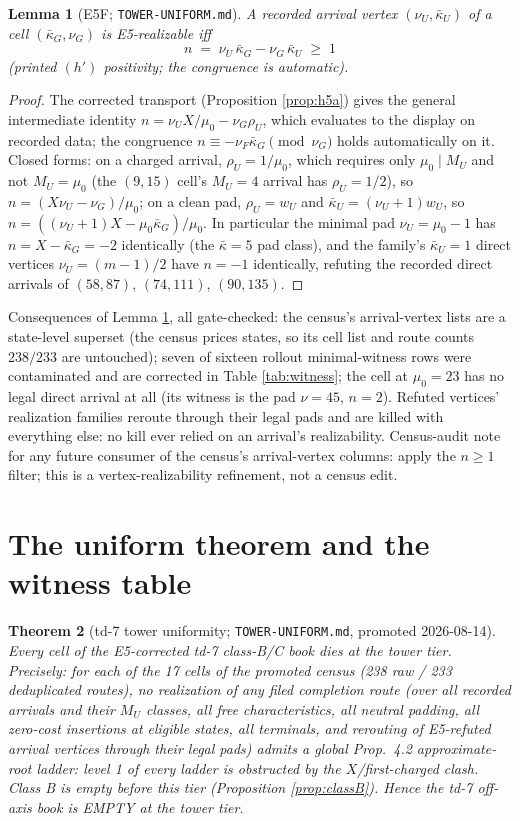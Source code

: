 \documentclass[11pt]{article}
\newtheorem{theorem}{Theorem}[section]
\newtheorem{lemma}[theorem]{Lemma}
\theoremstyle{definition}
\theoremstyle{remark}
\newcommand{\kb}{\bar\kappa}
\begin{document}
\begin{lemma}[E5F; \texttt{TOWER-UNIFORM.md}]\label{lem:E5F}
A recorded arrival vertex $(\nu_U,\kb_U)$ of a cell $(\kb_G,\nu_G)$ is E5-realizable iff
\[
n\;=\;\nu_U\,\kb_G-\nu_G\,\kb_U\;\geq\;1
\]
(printed $(h')$ positivity; the congruence is automatic).
\end{lemma}

\begin{proof}
The corrected transport (Proposition \ref{prop:h5a}) gives the general intermediate identity $n=\nu_U X/\mu_0-\nu_G\rho_U$, which evaluates to the display on recorded data; the congruence $n\equiv-\nu_F\kb_G\pmod{\nu_G}$ holds automatically on it. Closed forms: on a charged arrival, $\rho_U=1/\mu_0$, which requires only $\mu_0\mid M_U$ and not $M_U=\mu_0$ (the $(9,15)$ cell's $M_U=4$ arrival has $\rho_U=1/2$), so $n=(X\nu_U-\nu_G)/\mu_0$; on a clean pad, $\rho_U=w_U$ and $\kb_U=(\nu_U+1)w_U$, so $n=((\nu_U+1)X-\mu_0\kb_G)/\mu_0$. In particular the minimal pad $\nu_U=\mu_0-1$ has $n=X-\kb_G=-2$ identically (the $\kb=5$ pad class), and the family's $\kb_U=1$ direct vertices $\nu_U=(m-1)/2$ have $n=-1$ identically, refuting the recorded direct arrivals of $(58,87)$, $(74,111)$, $(90,135)$.
\end{proof}

Consequences of Lemma \ref{lem:E5F}, all gate-checked: the census's arrival-vertex lists are a state-level superset (the census prices states, so its cell list and route counts $238/233$ are untouched); seven of sixteen rollout minimal-witness rows were contaminated and are corrected in Table \ref{tab:witness}; the cell at $\mu_0=23$ has no legal direct arrival at all (its witness is the pad $\nu=45$, $n=2$). Refuted vertices' realization families reroute through their legal pads and are killed with everything else: no kill ever relied on an arrival's realizability. Census-audit note for any future consumer of the census's arrival-vertex columns: apply the $n\geq1$ filter; this is a vertex-realizability refinement, not a census edit.

\section{The uniform theorem and the witness table}\label{sec:uniform}

\begin{theorem}[td-7 tower uniformity; \texttt{TOWER-UNIFORM.md}, promoted 2026-08-14]\label{thm:uniform}
Every cell of the E5-corrected td-7 class-B/C book dies at the tower tier. Precisely: for each of the 17 cells of the promoted census (238 raw / 233 deduplicated routes), no realization of any filed completion route (over all recorded arrivals and their $M_U$ classes, all free characteristics, all neutral padding, all zero-cost insertions at eligible states, all terminals, and rerouting of E5-refuted arrival vertices through their legal pads) admits a global Prop.~4.2 approximate-root ladder: level 1 of every ladder is obstructed by the $X$/first-charged clash. Class B is empty before this tier (Proposition \ref{prop:classB}). Hence the td-7 off-axis book is EMPTY at the tower tier.
\end{theorem}
\end{document}
